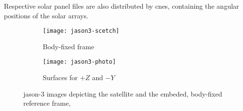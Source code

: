 Respective solar panel files are also distributed by \gls{cnes}, containing the 
angular positions of the solar arrays.

\begin{figure}
  \centering
  \begin{subfigure}[b]{0.45\textwidth}
    \centering
    \texttt{[image: jason3-scetch]}
    \caption{Body-fixed frame}
    \label{fig:jason3-scetch}
  \end{subfigure}
  \begin{subfigure}[b]{0.45\textwidth}
    \centering
    \texttt{[image: jason3-photo]}
    \caption{Surfaces for $+Z$ and $-Y$}
    \label{fig:jason3-photo}
  \end{subfigure}
  \caption{\gls{jason}-3 images depicting the satellite and the embeded, 
    body-fixed reference frame, \cite{Couderc2015}}
  \label{fig:jason3-view}
\end{figure}
